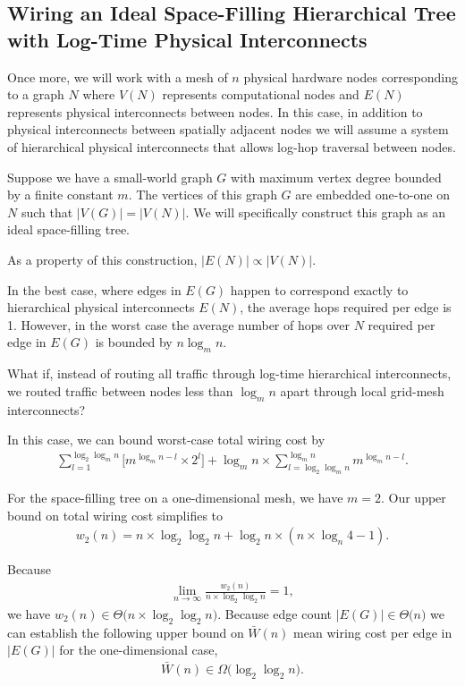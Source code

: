 \subsection{Wiring an Ideal Space-Filling Hierarchical Tree with Log-Time Physical Interconnects} \label{sec:proof3}

Once more, we will work with a mesh of $n$ physical hardware nodes corresponding to a graph $N$ where $V(N)$ represents computational nodes and $E(N)$ represents physical interconnects between nodes.
In this case, in addition to physical interconnects between spatially adjacent nodes we will assume a system of hierarchical physical interconnects that allows log-hop traversal between nodes.

Suppose we have a small-world graph $G$ with maximum vertex degree bounded by a finite constant $m$.
The vertices of this graph $G$ are embedded one-to-one on $N$ such that $|V(G)| = |V(N)|$.
We will specifically construct this graph as an ideal space-filling tree.

As a property of this construction, $|E(N)| \propto |V(N)|$.

In the best case, where edges in $E(G)$ happen to correspond exactly to hierarchical physical interconnects $E(N)$, the average hops required per edge is 1.
However, in the worst case the average number of hops over $N$ required per edge in $E(G)$ is bounded by $n \log_m n$.

What if, instead of routing all traffic through log-time hierarchical interconnects, we routed traffic between nodes less than $\log_m n$ apart through local grid-mesh interconnects?

In this case, we can bound worst-case total wiring cost by
\begin{align*}
\sum_{l = 1}^{\log_2 \log_m n} %
\Big[
  m^{\log_m n - l} %
  \times
  2^l %
\Big]
+
\log_m n %
\times
\sum_{l = \log_2 \log_m n }^{ \log_m n} %
m^{\log_m n - l}.
\end{align*}

For the space-filling tree on a one-dimensional mesh, we have $m = 2$.
Our upper bound on total wiring cost simplifies to
\begin{align*}
w_2(n) =
n \times \log_2 \log_2 n
+
\log_2 n \times (n \times \log_n 4 - 1).
\end{align*}

Because
\begin{align*}
\lim_{n \rightarrow \infty}
\frac{
  w_2(n)
}{
  n \times \log_2 \log_2 n
}
= 1,
\end{align*}
we have $w_2(n) \in \Theta \Big( n \times \log_2 \log_2 n \Big)$.
Because edge count $|E(G)| \in \Theta \Big( n \Big)$ we can establish the following upper bound on $\bar{W}(n)$ mean wiring cost per edge in $|E(G)|$ for the one-dimensional case,
\begin{align*}
\bar{W}(n) \in \Omega\Big( \log_2 \log_2 n \Big).
\end{align*}

